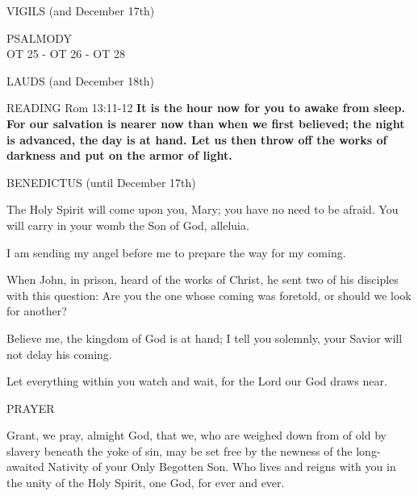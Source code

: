 \begin{flushleft}
\noindent\normalsize{\uppercase{Vigils} \small (and December 17th)}\\
\end{flushleft}
\indent\small{\uppercase{Psalmody\\}}
\indent OT 25 - OT 26 - OT 28      

\begin{flushleft}
\normalsize{\uppercase{Lauds} \small (and December 18th)}
\end{flushleft}

\noindent\small{\uppercase {Reading}} Rom 13:11-12  \textbf{It is the hour now for you to awake from sleep. For our salvation is nearer now than when we first believed; the night is advanced, the day is at hand. Let us then throw off the works of darkness and put on the armor of light.\\}

\noindent\small{\uppercase{Benedictus} (until December 17th)}
\begin{description}[labelindent=\parindent,leftmargin=*]
\item [1.] The Holy Spirit will come upon you, Mary; you have no need to be afraid. You will carry in your womb the Son of God, alleluia.
\item [2.] I am sending my angel before me to prepare the way for my coming.
\item [3.] When John, in prison, heard of the works of Christ, he sent two of his disciples with this question: Are you the one whose coming was foretold, or should we look for another?
\item [(December 17th)]
Believe me, the kingdom of God is at hand; I tell you solemnly, your Savior will not delay his coming.
\item [(December 18th)]
Let everything within you watch and wait, for the Lord our God draws near.
\end{description}


\noindent\small{\uppercase {Prayer}} 
\begin{description}[labelindent=\parindent, leftmargin=*]
 \item [(December 18th)] Grant, we pray, almight God, that we, who are weighed down from of old by slavery beneath the yoke of sin, may be set free by the newness of the long-awaited Nativity of your Only Begotten Son. Who lives and reigns with you in the unity of the Holy Spirit, one God, for ever and ever.
\end{description}

